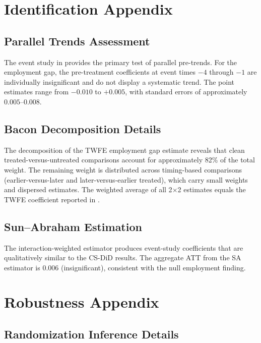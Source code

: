 \documentclass[12pt]{article}
\begin{document}
\section{Identification Appendix}\label{app:identification}

\subsection{Parallel Trends Assessment}

The event study in  provides the primary test of parallel pre-trends. For the employment gap, the pre-treatment coefficients at event times $-4$ through $-1$ are individually insignificant and do not display a systematic trend. The point estimates range from $-0.010$ to $+0.005$, with standard errors of approximately $0.005$--$0.008$.

\subsection{Bacon Decomposition Details}

The \citet{goodmanBacon2021} decomposition of the TWFE employment gap estimate reveals that clean treated-versus-untreated comparisons account for approximately 82\% of the total weight. The remaining weight is distributed across timing-based comparisons (earlier-versus-later and later-versus-earlier treated), which carry small weights and dispersed estimates. The weighted average of all 2$\times$2 estimates equals the TWFE coefficient reported in .

\subsection{Sun--Abraham Estimation}

The \citet{sunAbraham2021} interaction-weighted estimator produces event-study coefficients that are qualitatively similar to the CS-DiD results. The aggregate ATT from the SA estimator is $0.006$ (insignificant), consistent with the null employment finding.

\section{Robustness Appendix}\label{app:robustness}

\subsection{Randomization Inference Details}
\end{document}
